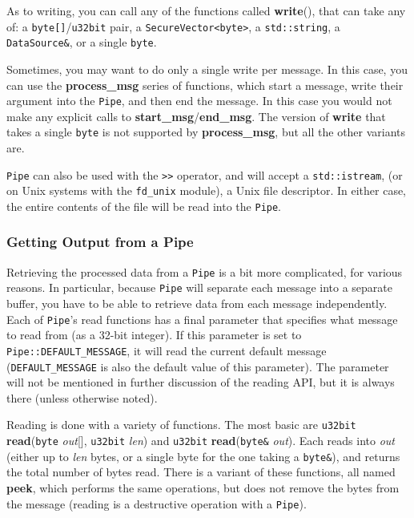 \documentclass{article}
\newcommand{\function}[1]{\textbf{#1}}
\newcommand{\type}[1]{\texttt{#1}}
\renewcommand{\arg}[1]{\textsl{#1}}
\begin{document}
As to writing, you can call any of the functions called \function{write}(),
that can take any of: a \type{byte[]}/\type{u32bit} pair, a
\type{SecureVector<byte>}, a \type{std::string}, a \type{DataSource\&}, or a
single \type{byte}.

Sometimes, you may want to do only a single write per message. In this case,
you can use the \function{process\_msg} series of functions, which start a
message, write their argument into the \type{Pipe}, and then end the
message. In this case you would not make any explicit calls to
\function{start\_msg}/\function{end\_msg}. The version of \function{write}
that takes a single \type{byte} is not supported by \function{process\_msg},
but all the other variants are.

\type{Pipe} can also be used with the \verb|>>| operator, and will accept a
\type{std::istream}, (or on Unix systems with the \verb|fd_unix| module), a
Unix file descriptor. In either case, the entire contents of the file will be
read into the \type{Pipe}.

\subsubsection{Getting Output from a Pipe}

Retrieving the processed data from a \type{Pipe} is a bit more complicated, for
various reasons. In particular, because \type{Pipe} will separate each message
into a separate buffer, you have to be able to retrieve data from each message
independently. Each of \type{Pipe}'s read functions has a final parameter that
specifies what message to read from (as a 32-bit integer). If this parameter is
set to \type{Pipe::DEFAULT\_MESSAGE}, it will read the current default message
(\type{DEFAULT\_MESSAGE} is also the default value of this parameter). The
parameter will not be mentioned in further discussion of the reading API, but
it is always there (unless otherwise noted).

Reading is done with a variety of functions. The most basic are \type{u32bit}
\function{read}(\type{byte} \arg{out}[], \type{u32bit} \arg{len}) and
\type{u32bit} \function{read}(\type{byte\&} \arg{out}). Each reads into
\arg{out} (either up to \arg{len} bytes, or a single byte for the one taking a
\type{byte\&}), and returns the total number of bytes read. There is a variant
of these functions, all named \function{peek}, which performs the same
operations, but does not remove the bytes from the message (reading is a
destructive operation with a \type{Pipe}).
\end{document}
